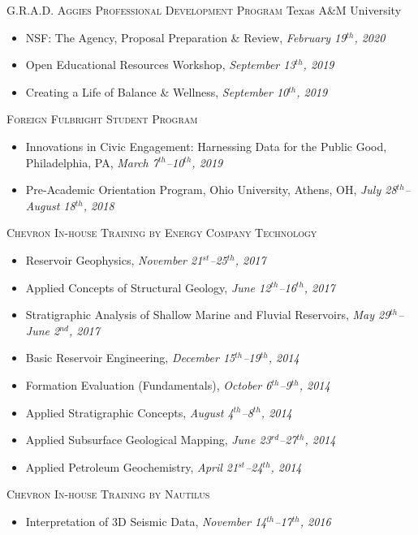 \documentclass[10pt]{article}
\begin{document}
\bigskip
\textsc{G.R.A.D. Aggies Professional Development Program} \hfill Texas A\&M University
\begin{itemize}[leftmargin=*]
    \item[] NSF: The Agency, Proposal Preparation \& Review, \textit{February 19$^{th}$, 2020}
    \item[] Open Educational Resources Workshop, \textit{September 13$^{th}$, 2019}
    \item[] Creating a Life of Balance \& Wellness, \textit{September 10$^{th}$, 2019}
\end{itemize} 

\bigskip
\textsc{Foreign Fulbright Student Program}
\begin{itemize}[leftmargin=*]
    \item[] Innovations in Civic Engagement: Harnessing Data for the Public Good, Philadelphia, PA, \textit{March 7$^{th}$–10$^{th}$, 2019}
    \item[] Pre-Academic Orientation Program, Ohio University, Athens, OH, \textit{July 28$^{th}$–August 18$^{th}$, 2018}
\end{itemize} 

\bigskip
\textsc{Chevron In-house Training by Energy Company Technology}
\begin{itemize}[leftmargin=*]
    \item[] Reservoir Geophysics, \textit{November 21$^{st}$–25$^{th}$, 2017}
    \item[] Applied Concepts of Structural Geology, \textit{June 12$^{th}$–16$^{th}$, 2017}
    \item[] Stratigraphic Analysis of Shallow Marine and Fluvial Reservoirs, \textit{May 29$^{th}$–June 2$^{nd}$, 2017} 
    \item[] Basic Reservoir Engineering, \textit{December 15$^{th}$–19$^{th}$, 2014}
    \item[] Formation Evaluation (Fundamentals), \textit{October 6$^{th}$–9$^{th}$, 2014}
    \item[] Applied Stratigraphic Concepts, \textit{August 4$^{th}$–8$^{th}$, 2014}
    \item[] Applied Subsurface Geological Mapping, \textit{June 23$^{rd}$–27$^{th}$, 2014}
    \item[] Applied Petroleum Geochemistry, \textit{April 21$^{st}$–24$^{th}$, 2014}
\end{itemize} 

\bigskip
\textsc{Chevron In-house Training by Nautilus}
\begin{itemize}[leftmargin=*]
    \item[] Interpretation of 3D Seismic Data, \textit{November 14$^{th}$–17$^{th}$, 2016}
\end{itemize} 
\end{document}
